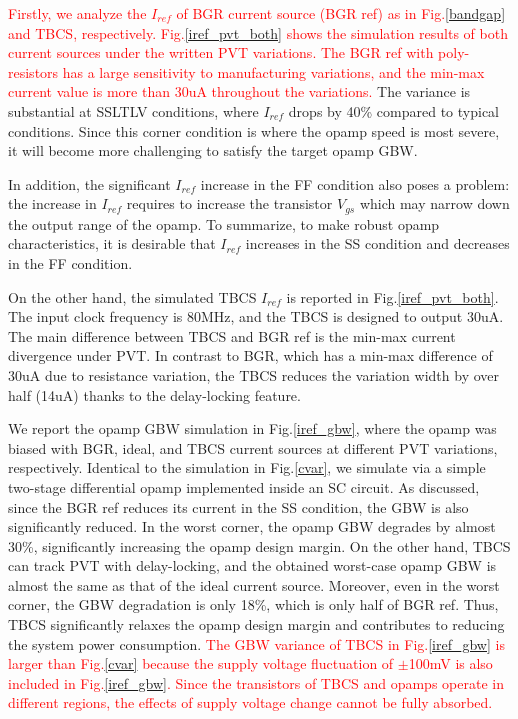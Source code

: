 \documentclass[paper]{ieice}
\begin{document}
\textcolor{red}{Firstly, we analyze the $I_{ref}$ of BGR current source (BGR ref)\cite{banba1999cmos} as in Fig.\ref{bandgap} and TBCS, respectively. Fig.\ref{iref_pvt_both} shows the simulation results of both current sources under the written PVT variations. The BGR ref with poly-resistors has a large sensitivity to manufacturing variations, and the min-max current value is more than 30uA throughout the variations.} The variance is substantial at SSLTLV conditions, where $I_{ref}$ drops by 40\% compared to typical conditions.
Since this corner condition is where the opamp speed is most severe, it will become more challenging to satisfy the target opamp GBW. %

In addition, the significant $I_{ref}$ increase in the FF condition also poses a problem: the increase in $I_{ref}$ requires to increase the transistor $V_{gs}$ which may narrow down the output range of the opamp. To summarize, to make robust opamp characteristics, it is desirable that $I_{ref}$ increases in the SS condition and decreases in the FF condition.

On the other hand, the simulated TBCS $I_{ref}$ is reported in Fig.\ref{iref_pvt_both}. The input clock frequency is 80MHz, and the TBCS is designed to output 30uA. The main difference between TBCS and BGR ref is the min-max current divergence under PVT. In contrast to BGR, which has a min-max difference of 30uA due to resistance variation, the TBCS reduces the variation width by over half (14uA) thanks to the delay-locking feature.

We report the opamp GBW simulation in Fig.\ref{iref_gbw}, where the opamp was biased with BGR, ideal, and TBCS current sources at different PVT variations, respectively. Identical to the simulation in Fig.\ref{cvar}, we simulate via a simple two-stage differential opamp implemented inside an SC circuit.
As discussed, since the BGR ref reduces its current in the SS condition, the GBW is also significantly reduced. In the worst corner, the opamp GBW degrades by almost 30\%, significantly increasing the opamp design margin.
On the other hand, TBCS can track PVT with delay-locking, and the obtained worst-case opamp GBW is almost the same as that of the ideal current source. Moreover, even in the worst corner, the GBW degradation is only 18\%, which is only half of BGR ref. Thus, TBCS significantly relaxes the opamp design margin and contributes to reducing the system power consumption.
\textcolor{red}{The GBW variance of TBCS in Fig.\ref{iref_gbw} is larger than Fig.\ref{cvar} because the supply voltage fluctuation of $\pm$100mV is also included in Fig.\ref{iref_gbw}. Since the transistors of TBCS and opamps operate in different regions, the effects of supply voltage change cannot be fully absorbed.}
\end{document}

